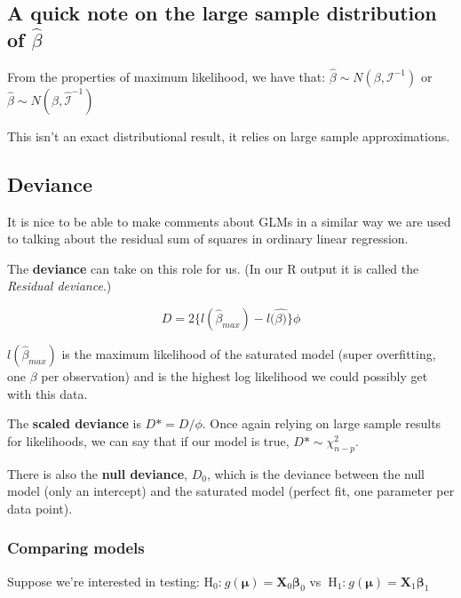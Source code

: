 \documentclass[
  openany]{book}
\begin{document}
\hypertarget{a-quick-note-on-the-large-sample-distribution-of-hatbeta}{%
\subsection{\texorpdfstring{A quick note on the large sample distribution of \(\hat{\beta}\)}{A quick note on the large sample distribution of \textbackslash hat\{\textbackslash beta\}}}\label{a-quick-note-on-the-large-sample-distribution-of-hatbeta}}

From the properties of maximum likelihood, we have that:
\(\hat{\beta} \sim N(\beta, \mathcal{I}^{-1})\) or
\(\hat{\beta} \sim N(\beta, \hat{\mathcal{I}}^{-1})\)

This isn't an exact distributional result, it relies on large sample
approximations.

\hypertarget{deviance}{%
\subsection{Deviance}\label{deviance}}

It is nice to be able to make comments about GLMs in a similar way we
are used to talking about the residual sum of squares in ordinary linear
regression.

The \textbf{deviance} can take on this role for us. (In our R output it is
called the \emph{Residual deviance}.)

\[D = 2 \{ l(\hat{\beta}_{max}) - l(\hat{\beta)} \}\phi \]

\(l(\hat{\beta}_{max})\) is the maximum likelihood of the saturated model
(super overfitting, one \(\beta\) per observation) and is the highest log
likelihood we could possibly get with this data.

The \textbf{scaled deviance} is \(D\text{*} = D/\phi\). Once again relying on
large sample results for likelihoods, we can say that if our model is
true, \(D\text{*} \sim \chi^2_{n-p}\).

There is also the \textbf{null deviance}, \(D_0\), which is the deviance
between the null model (only an intercept) and the saturated model
(perfect fit, one parameter per data point).

\hypertarget{comparing-models}{%
\subsubsection{Comparing models}\label{comparing-models}}

Suppose we're interested in testing:
\(\text{H}_0\text{:}\  g(\mathbf{\mu}) = \mathbf{X}_0\mathbf{\beta}_0\) vs
\(\ \text{H}_1\text{:}\  g(\mathbf{\mu}) = \mathbf{X}_1\mathbf{\beta}_1\)
\end{document}
